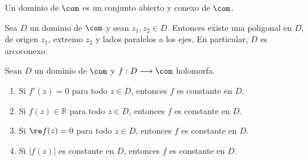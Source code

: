 \begin{defi}
Un dominio de $\com$ es un conjunto abierto y conexo de $\com$.
\end{defi} 
\begin{prop}
Sea $D$ un dominio de $\com$ y sean $z_1,z_2 \in D$. Entonces existe una poligonal en $D$, de origen $z_1$, extremo $z_2$ y lados paralelos a los ejes. En particular, $D$ es arcoconexo.
\end{prop}

\begin{teo}
Sean $D$ un dominio de $\com$ y $f: D \longrightarrow \com$ holomorfa.
\begin{enumerate}
    \item Si $f'(z) = 0$ para todo $z \in D$, entonces $f$ es constante en $D$.
    \item Si $f(z) \in \mathbb{R}$ para todo $z \in D$, entonces $f$ es constante en $D$.
    \item Si $\re f(z) = 0$ para todo $z \in D$, entonces $f$ es constante en $D$.
    \item Si $|f(z)|$ es constante en $D$, entonces $f$ es constante en $D$.
\end{enumerate}
\end{teo}

